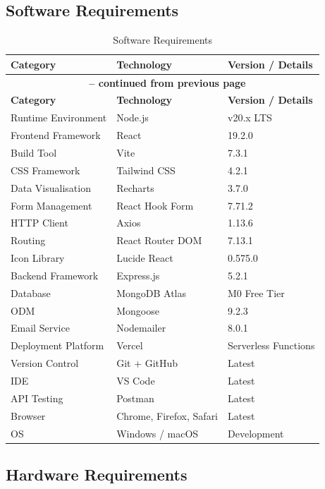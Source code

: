 \documentclass[12pt,a4paper]{report}
\begin{document}
\subsection{Software Requirements}

\begin{longtable}{|p{3.5cm}|p{4cm}|p{5cm}|}
\caption{Software Requirements} \\
\hline
\textbf{Category} & \textbf{Technology} & \textbf{Version / Details}\\
\hline
\endfirsthead
\multicolumn{3}{c}{{\bfseries \tablename\ \thetable{} -- continued from previous page}} \\
\hline
\textbf{Category} & \textbf{Technology} & \textbf{Version / Details}\\
\hline
\endhead
Runtime Environment & Node.js & v20.x LTS\\
\hline
Frontend Framework & React & 19.2.0\\
\hline
Build Tool & Vite & 7.3.1\\
\hline
CSS Framework & Tailwind CSS & 4.2.1\\
\hline
Data Visualisation & Recharts & 3.7.0\\
\hline
Form Management & React Hook Form & 7.71.2\\
\hline
HTTP Client & Axios & 1.13.6\\
\hline
Routing & React Router DOM & 7.13.1\\
\hline
Icon Library & Lucide React & 0.575.0\\
\hline
Backend Framework & Express.js & 5.2.1\\
\hline
Database & MongoDB Atlas & M0 Free Tier\\
\hline
ODM & Mongoose & 9.2.3\\
\hline
Email Service & Nodemailer & 8.0.1\\
\hline
Deployment Platform & Vercel & Serverless Functions\\
\hline
Version Control & Git + GitHub & Latest\\
\hline
IDE & VS Code & Latest\\
\hline
API Testing & Postman & Latest\\
\hline
Browser & Chrome, Firefox, Safari & Latest\\
\hline
OS & Windows / macOS & Development\\
\hline
\end{longtable}

\subsection{Hardware Requirements}
\end{document}
